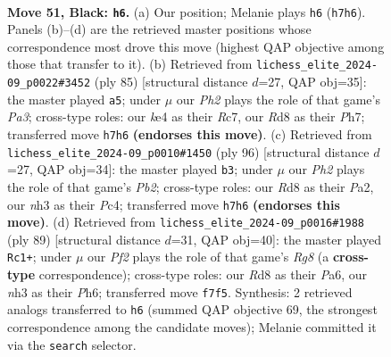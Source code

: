 \documentclass[11pt]{article}
\begin{document}
\clearpage

\begin{figure}[p]\centering
\begin{subfigure}{0.46\textwidth}\centering
\resizebox{\linewidth}{!}{%
\newchessgame
\chessboard[
  setfen={3r4/4kp1p/1r6/p5P1/3pK3/1P5N/1R5P/2R5 b - - 4 51},
  showmover=false,
  pgfstyle=straightmove, color=movearrow, markmove={h7-h6}
]}
\caption{}
\end{subfigure}\hfill
\begin{subfigure}{0.46\textwidth}\centering
\resizebox{\linewidth}{!}{%
\newchessgame
\chessboard[
  setfen={3r3k/2r4p/p5p1/2PP4/1P1R4/8/3p2K1/3N4 b - - 0 43},
  showmover=false,
  pgfstyle=straightmove, color=movearrow, markmove={a6-a5}
]}
\caption{}
\end{subfigure}
\\[4pt]
\begin{subfigure}{0.46\textwidth}\centering
\resizebox{\linewidth}{!}{%
\newchessgame
\chessboard[
  setfen={8/8/1p5r/p3k1p1/2P1P3/4KP2/PP5p/7R w - - 0 49},
  showmover=false,
  pgfstyle=straightmove, color=movearrow, markmove={b2-b3}
]}
\caption{}
\end{subfigure}\hfill
\begin{subfigure}{0.46\textwidth}\centering
\resizebox{\linewidth}{!}{%
\newchessgame
\chessboard[
  setfen={3r4/5pk1/p2P3p/1pK1R3/8/1P1R3P/1P6/6r1 b - - 0 45},
  showmover=false,
  pgfstyle=straightmove, color=movearrow, markmove={g1-c1}
]}
\caption{}
\end{subfigure}
\caption{\textbf{Move 51, Black: \texttt{h6}.} (a) Our position; Melanie plays \texttt{h6} (\texttt{h7h6}). Panels (b)--(d) are the retrieved master positions whose correspondence most drove this move (highest QAP objective among those that transfer to it). (b) Retrieved from \texttt{lichess\_elite\_2024-09\_p0022\#3452} (ply 85) [structural distance $d$=27, QAP obj=35]: the master played \texttt{a5}; under $\mu$ our \emph{Ph2} plays the role of that game's \emph{Pa3}; cross-type roles: our \emph{k}e4 as their \emph{R}c7, our \emph{R}d8 as their \emph{P}h7; transferred move \texttt{h7h6} \textbf{(endorses this move)}. (c) Retrieved from \texttt{lichess\_elite\_2024-09\_p0010\#1450} (ply 96) [structural distance $d$=27, QAP obj=34]: the master played \texttt{b3}; under $\mu$ our \emph{Ph2} plays the role of that game's \emph{Pb2}; cross-type roles: our \emph{R}d8 as their \emph{P}a2, our \emph{n}h3 as their \emph{P}c4; transferred move \texttt{h7h6} \textbf{(endorses this move)}. (d) Retrieved from \texttt{lichess\_elite\_2024-09\_p0016\#1988} (ply 89) [structural distance $d$=31, QAP obj=40]: the master played \texttt{Rc1+}; under $\mu$ our \emph{Pf2} plays the role of that game's \emph{Rg8} (a \textbf{cross-type} correspondence); cross-type roles: our \emph{R}d8 as their \emph{P}a6, our \emph{n}h3 as their \emph{P}h6; transferred move \texttt{f7f5}. Synthesis: 2 retrieved analogs transferred to \texttt{h6} (summed QAP objective 69, the strongest correspondence among the candidate moves); Melanie committed it via the \texttt{search} selector.}
\label{fig:thought-m101}
\end{figure}
\end{document}
